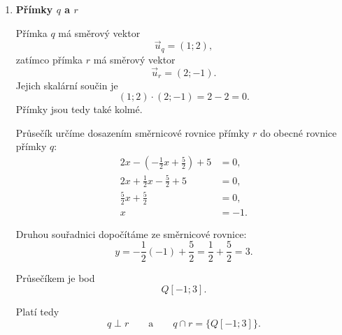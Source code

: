 \begin{example}
\begin{enumerate}[label=\alph*), leftmargin=2em]
        Vypočítáme skalární součin jejich směrových vektorů:
        \[
            \vec{u}_p\cdot\vec{u}_r
            =
            (1;2)\cdot(2;-1)
            =
            2-2
            =
            0.
        \]
        Přímky jsou tedy kolmé, a proto různoběžné.

        Průsečík určíme dosazením parametrického vyjádření přímky $p$
        do směrnicové rovnice přímky $r$:
        \begin{align*}
            2t
            &=
            -\frac12t+\frac52,\\
            \frac52t
            &=
            \frac52,\\
            t&=1.
        \end{align*}

        Pro $t=1$ dostáváme
        \[
            P[1;2].
        \]

        Platí tedy
        \[
            p\perp r
            \qquad\text{a}\qquad
            p\cap r=\{P[1;2]\}.
        \]

        \item \textbf{Přímky $q$ a $r$}

        Přímka $q$ má směrový vektor
        \[
            \vec{u}_q=(1;2),
        \]
        zatímco přímka $r$ má směrový vektor
        \[
            \vec{u}_r=(2;-1).
        \]
        Jejich skalární součin je
        \[
            (1;2)\cdot(2;-1)=2-2=0.
        \]
        Přímky jsou tedy také kolmé.

        Průsečík určíme dosazením směrnicové rovnice přímky $r$ do
        obecné rovnice přímky $q$:
        \begin{align*}
            2x-\left(-\frac12x+\frac52\right)+5&=0,\\
            2x+\frac12x-\frac52+5&=0,\\
            \frac52x+\frac52&=0,\\
            x&=-1.
        \end{align*}

        Druhou souřadnici dopočítáme ze směrnicové rovnice:
        \[
            y
            =
            -\frac12(-1)+\frac52
            =
            \frac12+\frac52
            =
            3.
        \]

        Průsečíkem je bod
        \[
            Q[-1;3].
        \]

        Platí tedy
        \[
            q\perp r
            \qquad\text{a}\qquad
            q\cap r=\{Q[-1;3]\}.
        \]


\end{enumerate}
\end{example}
